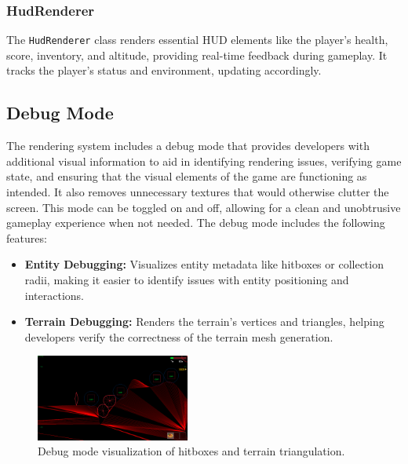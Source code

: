     \subsubsection{HudRenderer}

      The \texttt{HudRenderer} class renders essential HUD elements like the player's health, score, inventory, and altitude, providing real-time feedback during gameplay. It tracks the player's status and environment, updating accordingly.

    \subsection{Debug Mode}

The rendering system includes a debug mode that provides developers with additional visual information to aid in identifying rendering issues, verifying game state, and ensuring that the visual elements of the game are functioning as intended.
      It also removes unnecessary textures that would otherwise clutter the screen. 
      This mode can be toggled on and off, allowing for a clean and unobtrusive gameplay experience when not needed. 
      The debug mode includes the following features:

      \begin{itemize}
        \item \textbf{Entity Debugging:} Visualizes entity metadata like hitboxes or collection radii, making it easier to identify issues with entity positioning and interactions.
          \item \textbf{Terrain Debugging:} Renders the terrain's vertices and triangles, helping developers verify the correctness of the terrain mesh generation.
      \end{itemize}

      \vspace{-\abovedisplayskip}
      \begin{figure}[h!]
        \centering
        \includegraphics[width=0.45\textwidth]{figures/Debug-Mode.png}
        \caption{Debug mode visualization of hitboxes and terrain triangulation.}
        \label{fig:debug_mode}
      \end{figure}

